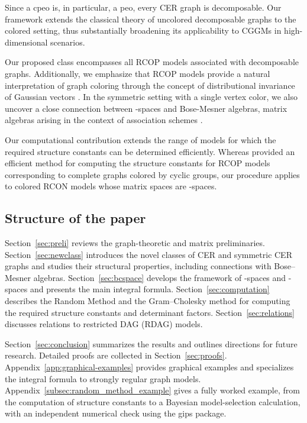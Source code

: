 \documentclass[12pt]{amsart}
\theoremstyle{plain}
\theoremstyle{definition}
\theoremstyle{remark}
\newcommand{\1}{\mathbf{1}}
\begin{document}
Since a cpeo is, in particular, a peo, every CER graph is decomposable. Our framework extends the classical theory of uncolored decomposable graphs to the colored setting, thus substantially broadening its applicability to CGGMs in high-dimensional scenarios.

Our proposed class encompasses all RCOP models associated with decomposable graphs. Additionally, we emphasize that RCOP models provide a natural interpretation of graph coloring through the concept of distributional invariance of Gaussian vectors \citep{A75,gips}. In the symmetric setting with a single vertex color, we also uncover a close connection between \cBC-spaces and Bose-Mesner algebras, matrix algebras arising in the context of association schemes \citep{BM59}.

Our computational contribution extends the range of models for which the required structure constants can be determined efficiently. Whereas \citet{GIKM22} provided an efficient method for computing the structure constants for RCOP models corresponding to complete graphs colored by cyclic groups, our procedure applies to colored RCON models whose matrix spaces are \cBC-spaces.

\subsection{Structure of the paper}

Section~\ref{sec:preli} reviews the graph-theoretic and matrix
preliminaries. Section~\ref{sec:newclass} introduces the novel classes of CER
and symmetric CER graphs and studies their structural properties,
including connections with Bose--Mesner algebras.
Section~\ref{sec:bcspace} develops the framework of \BC-spaces
and \cBC-spaces and presents the main integral formula.
Section~\ref{sec:computation} describes the Random Method and
the Gram--Cholesky method for computing the required structure
constants and determinant factors. Section~\ref{sec:relations}
discusses relations to restricted DAG (RDAG) models.

Section~\ref{sec:conclusion} summarizes the results and outlines
directions for future research. Detailed proofs are collected
in Section~\ref{sec:proofs}. Appendix~\ref{app:graphical-examples}
provides graphical examples and specializes the integral formula
to strongly regular graph models.
Appendix~\ref{subsec:random_method_example} gives a fully worked
example, from the computation of structure constants to a Bayesian
model-selection calculation, with an independent numerical check
using the \textsf{gips} package.
\end{document}
